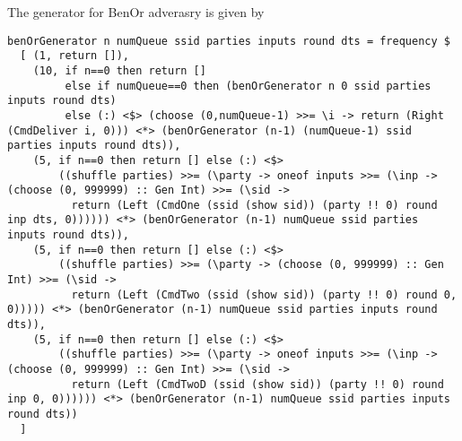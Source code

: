 The generator for BenOr adverasry is given by
\begin{lstlisting}
benOrGenerator n numQueue ssid parties inputs round dts = frequency $
  [ (1, return []), 
    (10, if n==0 then return []
         else if numQueue==0 then (benOrGenerator n 0 ssid parties inputs round dts)
         else (:) <$> (choose (0,numQueue-1) >>= \i -> return (Right (CmdDeliver i, 0))) <*> (benOrGenerator (n-1) (numQueue-1) ssid parties inputs round dts)),
    (5, if n==0 then return [] else (:) <$> 
        ((shuffle parties) >>= (\party -> oneof inputs >>= (\inp -> (choose (0, 999999) :: Gen Int) >>= (\sid -> 
          return (Left (CmdOne (ssid (show sid)) (party !! 0) round inp dts, 0)))))) <*> (benOrGenerator (n-1) numQueue ssid parties inputs round dts)),
    (5, if n==0 then return [] else (:) <$>
        ((shuffle parties) >>= (\party -> (choose (0, 999999) :: Gen Int) >>= (\sid -> 
          return (Left (CmdTwo (ssid (show sid)) (party !! 0) round 0, 0))))) <*> (benOrGenerator (n-1) numQueue ssid parties inputs round dts)),
    (5, if n==0 then return [] else (:) <$>
        ((shuffle parties) >>= (\party -> oneof inputs >>= (\inp -> (choose (0, 999999) :: Gen Int) >>= (\sid -> 
          return (Left (CmdTwoD (ssid (show sid)) (party !! 0) round inp 0, 0)))))) <*> (benOrGenerator (n-1) numQueue ssid parties inputs round dts)) 
  ]
\end{lstlisting}

